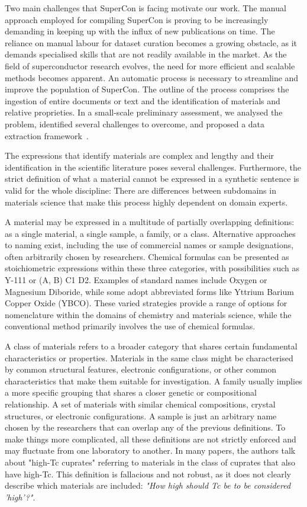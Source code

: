 Two main challenges that SuperCon is facing motivate our work. 
The manual approach employed for compiling SuperCon is proving to be increasingly demanding in keeping up with the influx of new publications on time. The reliance on manual labour for dataset curation becomes a growing obstacle, as it demands specialised skills that are not readily available in the market. As the field of superconductor research evolves, the need for more efficient and scalable methods becomes apparent.
An automatic process is necessary to streamline and improve the population of SuperCon. 
The outline of the process comprises the ingestion of entire documents or text and the identification of materials and relative proprieties.  
In a small-scale preliminary assessment, we analysed the problem, identified several challenges to overcome, and proposed a data extraction framework~\cite{foppiano2019proposal}.

The expressions that identify materials are complex and lengthy and their identification in the scientific literature poses several challenges.
Furthermore, the strict definition of what a material cannot be expressed in a synthetic sentence is valid for the whole discipline: There are differences between subdomains in materials science that make this process highly dependent on domain experts.

A material may be expressed in a multitude of partially overlapping definitions: as a single material, a single sample, a family, or a class.
Alternative approaches to naming exist, including the use of commercial names or sample designations, often arbitrarily chosen by researchers. Chemical formulas can be presented as stoichiometric expressions within these three categories, with possibilities such as Y-111 or (A, B) C1 D2. Examples of standard names include Oxygen or Magnesium Diboride, while some adopt abbreviated forms like Yttrium Barium Copper Oxide (YBCO). These varied strategies provide a range of options for nomenclature within the domains of chemistry and materials science, while the conventional method primarily involves the use of chemical formulas.

A class of materials refers to a broader category that shares certain fundamental characteristics or properties. Materials in the same class might be characterised by common structural features, electronic configurations, or other common characteristics that make them suitable for investigation. 
A family usually implies a more specific grouping that shares a closer genetic or compositional relationship. A set of materials with similar chemical compositions, crystal structures, or electronic configurations. 
A sample is just an arbitrary name chosen by the researchers that can overlap any of the previous definitions. 
To make things more complicated, all these definitions are not strictly enforced and may fluctuate from one laboratory to another. 
In many papers, the authors talk about "high-Tc cuprates" referring to materials in the class of cuprates that also have high-Tc. This definition is fallacious and not robust, as it does not clearly describe which materials are included: \textit{"How high should Tc be to be considered 'high'?"}.

